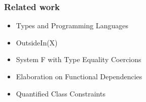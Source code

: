 \documentclass{beamer}
\begin{document}
\begin{frame}
    \frametitle{Related work}
    \begin{itemize}
        \item Types and Programming Languages
        \item OutsideIn(X)
        \item System F with Type Equality Coercions
        \item Elaboration on Functional Dependencies
        \item Quantified Class Constraints
    \end{itemize}
\end{frame}

%
\end{document}

